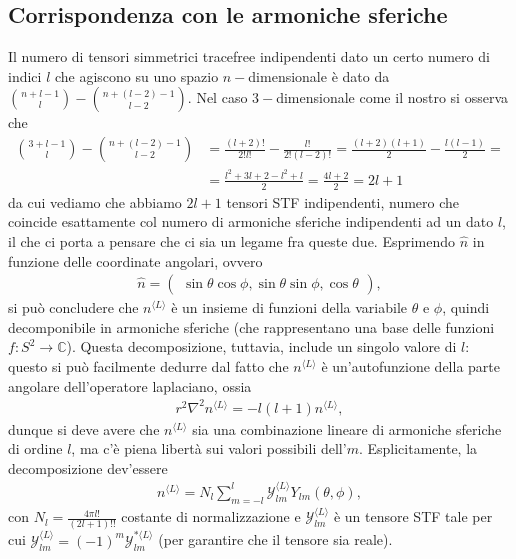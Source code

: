 \subsection{Corrispondenza con le armoniche sferiche}

Il numero di tensori simmetrici tracefree indipendenti dato un certo numero di indici $l$ che agiscono su uno spazio $n-$dimensionale è dato da $\binom{n+l-1}{l} - \binom{n+(l-2)-1}{l-2}$. Nel caso $3-$dimensionale come il nostro si osserva che
\begin{align}
	\binom{3+l-1}{l} - \binom{n+(l-2)-1}{l-2} &= \frac{(l + 2)!}{2!l!} - \frac{l!}{2!(l-2)!} = \frac{(l+2)(l+1)}{2} - \frac{l(l-1)}{2} = \\
	&= \frac{l^2 + 3l + 2 - l^2 + l}{2} = \frac{4l + 2}{2} = 2l+1  
\end{align}
da cui vediamo che abbiamo $2l+1$ tensori STF indipendenti, numero che coincide esattamente col numero di armoniche sferiche indipendenti ad un dato $l$, il che ci porta a pensare che ci sia un legame fra queste due. Esprimendo $\hat{n}$ in funzione delle coordinate angolari, ovvero
\begin{align}
	\hat{n} = \begin{pmatrix} \sin{\theta} \cos{\phi}, \sin{\theta} \sin{\phi}, \cos{\theta} \end{pmatrix},
\end{align}
si può concludere che $n^{\langle L \rangle}$ è un insieme di funzioni della variabile $\theta$ e $\phi$, quindi decomponibile in armoniche sferiche (che rappresentano una base delle funzioni $f: S^2 \to \mathbb{C}$). Questa decomposizione, tuttavia, include un singolo valore di $l$: questo si può facilmente dedurre dal fatto che $n^{\langle L \rangle}$ è un'autofunzione della parte angolare dell'operatore laplaciano, ossia
\begin{align}
	r^2 \nabla^2 n^{\langle L \rangle} = -l(l+1)n^{\langle L \rangle},
\end{align}
dunque si deve avere che $n^{\langle L \rangle}$ sia una combinazione lineare di armoniche sferiche di ordine $l$, ma c'è piena libertà sui valori possibili dell'$m$. Esplicitamente, la decomposizione dev'essere
\begin{align} \label{eq:stf_decomposition}
	n^{\langle L \rangle} = N_l \sum_{m=-l}^{l} \mathcal{Y}_{lm}^{\langle L \rangle} Y_{lm}(\theta, \phi),
\end{align}
con $N_l = \frac{4 \pi l!}{(2l+1)!!}$ costante di normalizzazione e $\mathcal{Y}_{lm}^{\langle L \rangle}$ è un tensore STF tale per cui $\mathcal{Y}_{lm}^{\langle L \rangle} = (-1)^m \mathcal{Y}^{* \langle L \rangle}_{lm}$ (per garantire che il tensore sia reale). \\
